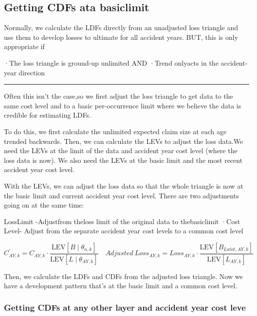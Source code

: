\documentclass[
]{article}
\begin{document}
\subsection{Getting CDFs ata
basiclimit}\label{getting-cdfs-ata-basiclimit}

Normally, we calculate the LDFs directly from an unadjusted loss
triangle and use them to develop losses to ultimate for all accident
years. BUT, this is only appropriate if

·The loss triangle is ground-up unlimited AND ·Trend onlyacts in the
accident-year direction

\begin{center}\rule{0.5\linewidth}{0.5pt}\end{center}

Often this isn't the case,so we first adjust the loss triangle to get
data to the same cost level and to a basic per-occurrence limit where we
believe the data is credible for estimating LDFs.

To do this, we first calculate the unlimited expected claim size at each
age trended backwards. Then, we can calculate the LEVs to adjust the
loss data.We need the LEVs at the limit of the data and accident year
cost level (where the loss data is now). We also need the LEVs at the
basic limit and the most recent accident year cost level.

With the LEVs, we can adjust the loss data so that the whole triangle is
now at the basic limit and current accident year cost level. There are
two adjustments going on at the same time:

LossLimit -Adjustfrom theloss limit of the original data to
thebasiclimit ·Cost Level- Adjust from the separate accident year cost
levels to a common cost level

\[\boxed{C_{AY,k}^{\prime}=C_{AY,k}\cdot\frac{\mathrm{LEV}\left[B\mid\theta_{n,k}\right]}{\mathrm{LEV}\left[L\mid\theta_{AY,k}\right]}}\quad Adjusted\:Loss_{AY,k}=Loss_{AY,k}\cdot\frac{\mathrm{LEV}\left[B_{Latot,AY,k}\right]}{\mathrm{LEV}\left[L_{AY,k}\right]}\]

Then, we calculate the LDFs and CDFs from the adjusted loss triangle.
Now we have a development pattern that's at the basic limit and a common
cost level.

\subsubsection{Getting CDFs at any other layer and accident year cost
leve}\label{getting-cdfs-at-any-other-layer-and-accident-year-cost-leve}
\end{document}
